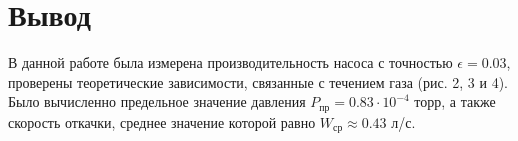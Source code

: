 \documentclass[a4paper,12pt]{article} %
\begin{document}
\section{Вывод}
В данной работе была измерена производительность насоса с точностью $\epsilon = 0.03$, проверены теоретические зависимости, связанные с течением газа (рис. 2, 3 и 4). Было вычисленно предельное значение давления $P_{\text{пр}} = 0.83 \cdot 10^{-4}$ торр, а также скорость откачки, среднее значение которой равно $W_{ср} \approx 0.43$ л/с.
\end{document}
